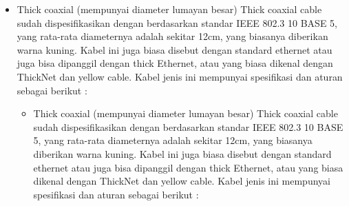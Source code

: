 	\begin{itemize}
		\item Thick coaxial (mempunyai diameter lumayan besar) Thick coaxial cable sudah dispesifikasikan dengan berdasarkan standar IEEE 802.3 10 BASE 5, yang rata-rata diameternya adalah sekitar 12cm, yang biasanya diberikan warna kuning. Kabel ini juga biasa disebut dengan standard ethernet atau juga bisa dipanggil dengan thick Ethernet, atau yang biasa dikenal dengan ThickNet dan yellow cable. Kabel jenis ini mempunyai spesifikasi dan aturan sebagai berikut :


	\begin{itemize}
		\item Thick coaxial (mempunyai diameter lumayan besar) Thick coaxial cable sudah dispesifikasikan dengan berdasarkan standar IEEE 802.3 10 BASE 5, yang rata-rata diameternya adalah sekitar 12cm, yang biasanya diberikan warna kuning. Kabel ini juga biasa disebut dengan standard ethernet atau juga bisa dipanggil dengan thick Ethernet, atau yang biasa dikenal dengan ThickNet dan yellow cable. Kabel jenis ini mempunyai spesifikasi dan aturan sebagai berikut :


\end{itemize}
\end{itemize}
